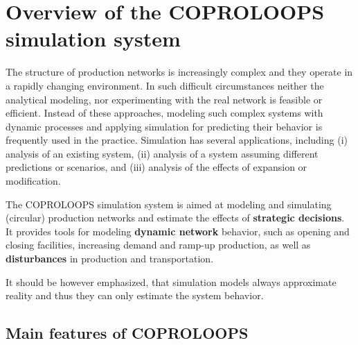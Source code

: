 \documentclass{article}
\newcommand{\NAME}{COPROLOOPS }
\begin{document}
\newpage
\tableofcontents
\newpage

\section{Overview of the \NAME simulation system}

The structure of production networks is increasingly complex and they operate in a rapidly changing environment. In such difficult circumstances neither the analytical modeling, nor experimenting with the real network is feasible or efficient. Instead of these approaches, modeling such complex systems with dynamic processes and applying simulation for predicting their behavior is frequently used in the practice. Simulation has several applications, including (i) analysis of an existing system, (ii) analysis of a system assuming different predictions or scenarios, and (iii) analysis of the effects of expansion or modification.

The \NAME simulation system is aimed at modeling and simulating (circular) production networks and estimate the effects of \textbf{strategic decisions}. It provides tools for modeling \textbf{dynamic network} behavior, such as opening and closing facilities, increasing demand and ramp-up production, as well as \textbf{disturbances} in production and transportation.

It should be however emphasized, that simulation models always approximate reality and thus they can only estimate the system behavior.


\subsection{Main features of \NAME}
\end{document}
